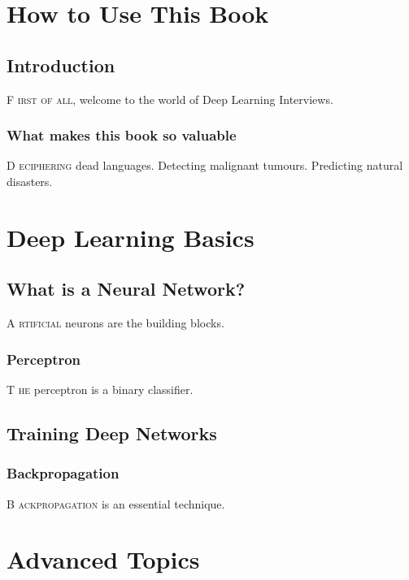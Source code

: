 \documentclass{book}
\begin{document}
\tableofcontents
\clearpage

\chapter{How to Use This Book}

\section{Introduction}
\lettrine{F}{ irst of all}, welcome to the world of Deep Learning Interviews. \lipsum[1]

\subsection{What makes this book so valuable}
\lettrine{D}{ eciphering} dead languages. Detecting malignant tumours. Predicting natural disasters. \lipsum[2]

\chapter{Deep Learning Basics}

\section{What is a Neural Network?}
\lettrine{A}{ rtificial} neurons are the building blocks. \lipsum[3]

\subsection{Perceptron}
\lettrine{T}{ he} perceptron is a binary classifier. \lipsum[4]

\section{Training Deep Networks}
\subsection{Backpropagation}
\lettrine{B}{ ackpropagation} is an essential technique. \lipsum[5]

\chapter{Advanced Topics}
\end{document}

